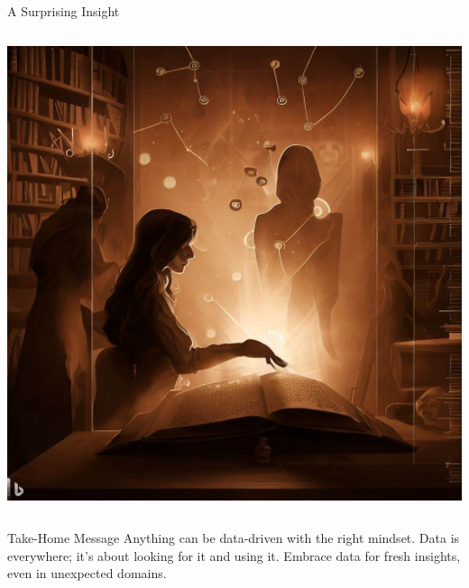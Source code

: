 \begin{frame}{A Surprising Insight}
\begin{columns}[T]
  \begin{column}{0.4\textwidth}
    \includegraphics[width=\textwidth]{../figures/dalle-insights} %
  \end{column}

\end{columns}

\vspace{0.5em}

\begin{block}{Take-Home Message}
Anything can be data-driven with the right mindset. Data is everywhere; it's about looking for it and using it. Embrace data for fresh insights, even in unexpected domains.
\end{block}

\end{frame}


